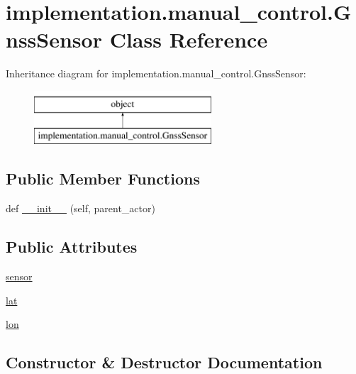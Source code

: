 \hypertarget{classimplementation_1_1manual__control_1_1_gnss_sensor}{}\section{implementation.\+manual\+\_\+control.\+Gnss\+Sensor Class Reference}
\label{classimplementation_1_1manual__control_1_1_gnss_sensor}
Inheritance diagram for implementation.\+manual\+\_\+control.\+Gnss\+Sensor\+:\begin{figure}[H]
\begin{center}
\leavevmode
\includegraphics[height=2.000000cm]{classimplementation_1_1manual__control_1_1_gnss_sensor}
\end{center}
\end{figure}
\subsection*{Public Member Functions}
\begin{DoxyCompactItemize}
\item 
def \hyperlink{classimplementation_1_1manual__control_1_1_gnss_sensor_a5b79d29ae0f05aae01ed872f3d3ca156}{\+\_\+\+\_\+init\+\_\+\+\_\+} (self, parent\+\_\+actor)
\end{DoxyCompactItemize}
\subsection*{Public Attributes}
\begin{DoxyCompactItemize}
\item 
\hyperlink{classimplementation_1_1manual__control_1_1_gnss_sensor_a55c8133724d2eb8b349a3c5fbf29f3ac}{sensor}
\item 
\hyperlink{classimplementation_1_1manual__control_1_1_gnss_sensor_a6b47354939272b7f92fcc80444866cf4}{lat}
\item 
\hyperlink{classimplementation_1_1manual__control_1_1_gnss_sensor_aff72b8285bcadf60c4aa0070359ec607}{lon}
\end{DoxyCompactItemize}


\subsection{Constructor \& Destructor Documentation}
\mbox{\label{classimplementation_1_1manual__control_1_1_gnss_sensor_a5b79d29ae0f05aae01ed872f3d3ca156}} 
